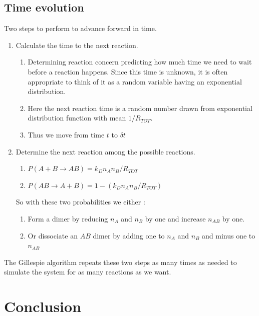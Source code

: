 \documentclass[11pt,a4paper]{article}
\begin{document}
\subsection{Time evolution}
Two steps to perform to advance forward in time.
\begin{enumerate}
  \item Calculate the time to the next reaction.
    \begin{enumerate}
      \item Determining reaction concern predicting how much time we need to wait before a reaction happens. Since this time is unknown, it is often appropriate to think of it as a random variable having an exponential distribution.
      \item Here the next reaction time is a random number drawn from exponential distribution function with mean $1/R_{TOT}$.
      \item Thus we move from time $t$ to $\delta t$
    \end{enumerate}

  \item Determine the next reaction among the possible reactions.
  \begin{enumerate}
    \item $P(A + B  \rightarrow AB) = k_{D}n_{A}n_{B} / R_{TOT} $
    \item $P(AB  \rightarrow A + B) = 1 - (k_{D}n_{A}n_{B} / R_{TOT}) $
  \end{enumerate}
  So with these two probabilities we either :
  \begin{enumerate}
  \item Form a dimer by reducing $n_{A}$ and $n_{B}$ by one and increase $n_{AB}$ by one.
  \item Or dissociate an $AB$ dimer by adding one to $n_{A}$ and $n_{B}$ and minus one to $n_{AB}$
  \end{enumerate}
\end{enumerate}
The Gillespie algorithm repeats these two steps as many times as needed to simulate the system for as many reactions as we want.

\section{Conclusion}

\newpage


\end{document}
